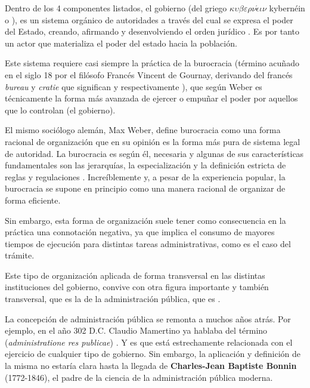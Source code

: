 Dentro de los 4 componentes listados, el gobierno 
(del griego $\kappa \upsilon \beta \varepsilon \rho \nu \acute{\epsilon} \iota \nu$ kybernéin  o ), 
es un sistema orgánico de autoridades a través del cual se expresa el poder del Estado, creando, afirmando y desenvolviendo el orden jurídico \cite{fernandezruizDerechoParlamentario2023}. 
Es por tanto un actor que materializa el poder del estado hacia la población.

Este sistema requiere casi siempre la práctica de la burocracia 
(término acuñado en el siglo 18 por el filósofo Francés Vincent de Gournay, derivando del francés \textit{bureau} y \textit{cratie} que significan  y  respectivamente \cite{rockmanBureaucracyStructureProcesses2024}), 
que según Weber es técnicamente la forma más avanzada de ejercer o empuñar el poder por aquellos que lo controlan \cite[114]{watersWeberRationalismModern2015} (el gobierno). 

El mismo sociólogo alemán, Max Weber, define burocracia como una forma racional de organización que en su opinión es la forma más pura de sistema legal de autoridad. 
La burocracia es según él, necesaria y algunas de sus características fundamentales son las jerarquías, la especialización y la definición estricta de reglas y regulaciones \cite{archerDictionaryPublicAdministration2022}. 
Increíblemente y, a pesar de la experiencia popular, la burocracia se supone en principio como una manera racional de organizar de forma eficiente.

Sin embargo, esta forma de organización suele tener como consecuencia en la práctica una connotación negativa, 
ya que implica el consumo de mayores tiempos de ejecución para distintas tareas administrativas, como es el caso del trámite.

Este tipo de organización aplicada de forma transversal en las distintas instituciones del gobierno,
convive con otra figura importante y también transversal, que es la de la administración pública,
que es  \cite{guerreroCharlesJeanBonninSiglo2020}.

La concepción de administración pública se remonta a muchos años atrás. 
Por ejemplo, en el año 302 D.C. Claudio Mamertino ya hablaba del término  (\textit{administratione res publicae}) \cite{nixonPraiseLaterRoman1994}. 
Y es que está estrechamente relacionada con el ejercicio de cualquier tipo de gobierno. 
Sin embargo, la aplicación y definición de la misma no estaría clara hasta la llegada de \textbf{Charles-Jean Baptiste Bonnin} (1772-1846), 
el padre de la ciencia de la administración pública moderna.


